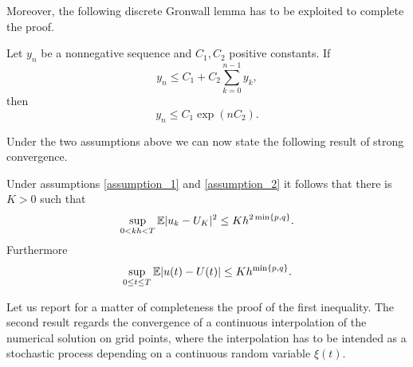 \noindent Moreover, the following discrete Gronwall lemma has to be exploited to complete the proof. 
\begin{lemma}\label{thm:Gronwall} Let $y_n$ be a nonnegative sequence and $C_1, C_2$ positive constants. If
	\begin{equation}
	y_n \leq C_1 + C_2 \sum_{k=0}^{n-1} y_k,
	\end{equation}
	then 
	\begin{equation}
	y_n \leq C_1 \exp(nC_2).
	\end{equation}
\end{lemma}
\noindent Under the two assumptions above we can now state the following result of strong convergence.  
\begin{theorem}\label{thm:strongConv} Under assumptions \ref{assumption_1} and \ref{assumption_2} it follows that there is $K>0$ such that
\begin{equation}\label{strongConvDisc}
	\sup_{0<kh<T} \mathbb{E}|u_k - U_K|^2 \leq Kh^{2\min\{p,q\}}.
\end{equation}
Furthermore
\begin{equation}\label{strongConvCont}
	\sup_{0\leq t \leq T} \mathbb{E}|u(t) - U(t)| \leq Kh^{\min\{p, q\}}.
\end{equation}
\end{theorem}
\noindent Let us report for a matter of completeness the proof of the first inequality. The second result regards the convergence of a continuous interpolation of the numerical solution on grid points, where the interpolation has to be intended as a stochastic process depending on a continuous random variable $\xi(t)$. 
